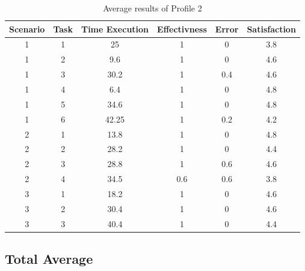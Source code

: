 \begin{table}[H]
  \begin{center}
    \begin{tabular}{||c|c|c|c|c|c||} %
      \textbf{Scenario} & \textbf{Task} & \textbf{Time Execution} & \textbf{Effectivness} & \textbf{Error} & \textbf{Satisfaction}\\
      
      \hline
        1 & 1 & 25 & 1 & 0 & 3.8\\
        1 & 2 & 9.6 & 1 & 0 & 4.6\\
        1 & 3 & 30.2 & 1 & 0.4 & 4.6\\
        1 & 4 & 6.4 & 1 & 0 & 4.8\\
        1 & 5 & 34.6 & 1 & 0 & 4.8\\
        1 & 6 & 42.25 & 1 & 0.2 & 4.2\\
        \hline
        2 & 1 & 13.8 & 1 & 0 & 4.8\\
        2 & 2 & 28.2 & 1 & 0 & 4.4\\
        2 & 3 & 28.8 & 1 & 0.6 & 4.6\\
        2 & 4 & 34.5 & 0.6 & 0.6 & 3.8\\
        \hline
        3 & 1 & 18.2 & 1 & 0 & 4.6\\
        3 & 2 & 30.4 & 1 & 0 & 4.6\\
        3 & 3 & 40.4 & 1 & 0 & 4.4\\
        \hline

    \end{tabular}
  \end{center}
  \caption{Average results of Profile 2}
\end{table}

\subsection{Total Average}

